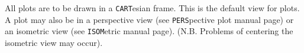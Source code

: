 \headb

All plots are to be drawn in a {\tt CART}esian frame.  This
is the default view for plots.
A plot may also be in a perspective view (see {\tt PERS}pective
plot manual page) or an isometric view
(see {\tt ISOM}etric manual page). (N.B. Problems of centering the
isometric view may occur).
\vfill
\eject
